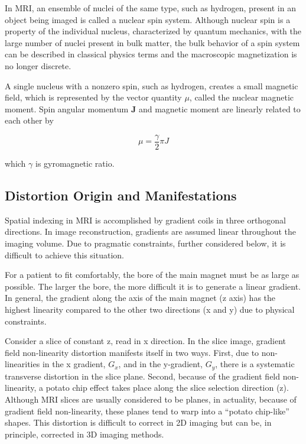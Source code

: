 In MRI, an ensemble of nuclei of the same type, such as hydrogen, present in an object being imaged is 
called a nuclear spin system. Although nuclear spin is a property of the individual nucleus, 
characterized by quantum mechanics, with the large number of nuclei present in bulk matter, the bulk 
behavior of a spin system can be described in classical physics terms and the macroscopic magnetization 
is no longer discrete.

A single nucleus with a nonzero spin, such as hydrogen, creates a small magnetic field, which is 
represented by the vector quantity $\mu$, called the nuclear magnetic moment. Spin angular momentum 
$\textbf{J}$ and magnetic moment are linearly related to each other by

\begin{equation}
  \mu = \frac{\gamma}{2}\pi J
\end{equation}

which $\gamma$ is gyromagnetic ratio.

\subsection{Distortion Origin and Manifestations}

Spatial indexing in MRI is accomplished by gradient coils in three orthogonal directions. In image 
reconstruction, gradients are assumed linear throughout the imaging volume. Due to pragmatic 
constraints, further considered below, it is difficult to achieve this situation.

For a patient to fit comfortably, the bore of the main magnet must be as large as possible. The larger 
the bore, the more difficult it is to generate a linear gradient. In general, the gradient along the 
axis of the main magnet (z axis) has the highest linearity compared to the other two directions 
(x and y) due to physical constraints.

Consider a slice of constant z, read in x direction. In the slice image, gradient field non-linearity 
distortion manifests itself in two ways. First, due to non-linearities in the x gradient, $G_x$, and in 
the y-gradient, $G_y$, there is a systematic transverse distortion in the slice plane. Second, 
because of 
the gradient field non-linearity, a potato chip effect takes place along the slice selection direction 
(z). Although MRI slices are usually considered to be planes, in actuality, because of gradient field 
non-linearity, these planes tend to warp into a “potato chip-like” shapes. This distortion is difficult
to correct in 2D imaging but can be, in principle, corrected in 3D imaging methods.

